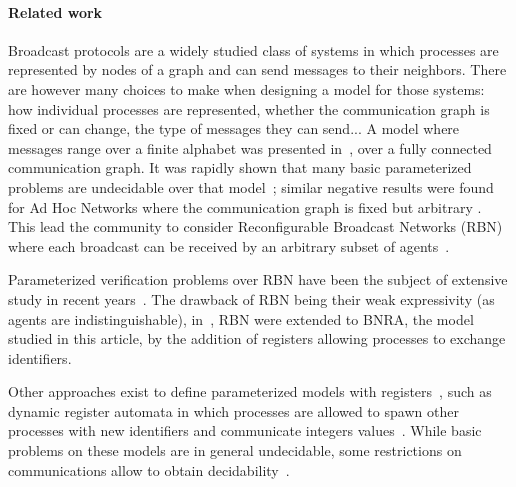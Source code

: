 \paragraph*{Related work} 
Broadcast protocols are a widely studied class of systems in which processes are represented by nodes of a graph and can send messages to their neighbors. There are however many choices to make when designing a model for those systems: how individual processes are represented, whether the communication graph is fixed or can change, the type of messages they can send... 
A model where messages range over a finite alphabet was presented in~\cite{emerson1998model}, over a fully connected communication graph. It was rapidly shown that many basic parameterized problems are undecidable over that model~\cite{EsparzaFM1999verification}; similar negative results were found for Ad Hoc Networks where the communication graph is fixed but arbitrary \cite{DelzannoSZ2010Adhoc}. This lead the community to consider Reconfigurable Broadcast Networks (RBN) where each broadcast can be received by an arbitrary subset of agents~\cite{DelzannoSZ2010Adhoc}.

Parameterized verification problems over RBN have been the subject of extensive study in recent years~\cite{DelzannoSTZ12, Balasubramanian18, BalasubramanianGW22, DBLP:journals/computing/ChiniMS22}. The drawback of RBN being their weak expressivity (as agents are indistinguishable), in~\cite{DelzannoST13}, RBN were extended to BNRA, the model studied in this article, by the addition of registers allowing processes to exchange identifiers. 

Other approaches exist to define parameterized models with registers~\cite{BolligRS21}, such as dynamic register automata in which processes are allowed to spawn other processes with new identifiers and communicate integers values~\cite{AbdullaAKR14}. While basic problems on these models are in general undecidable, some restrictions on communications allow to obtain decidability~\cite{AbdullaAKR15, Rezine17}.

